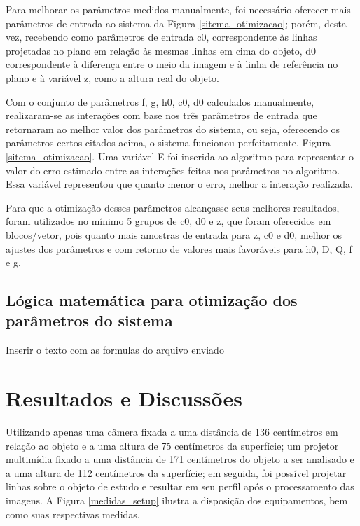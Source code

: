 \documentclass[a4paper, 12pt]{article}
\begin{document}
Para melhorar os parâmetros medidos manualmente, foi necessário oferecer mais parâmetros de entrada ao sistema da Figura \ref{sitema_otimizacao}; porém, desta vez, recebendo como parâmetros de entrada c0, correspondente às linhas projetadas no plano em relação às mesmas linhas em cima do objeto, d0 correspondente à diferença entre o meio da imagem e à linha de referência no plano e à variável z, como a altura real do objeto.

Com o conjunto de parâmetros f, g, h0, c0, d0 calculados manualmente, realizaram-se as interações com base nos três parâmetros de entrada que retornaram ao melhor valor dos parâmetros do sistema, ou seja, oferecendo os parâmetros certos citados acima, o sistema funcionou perfeitamente, Figura \ref{sitema_otimizacao}. Uma variável E foi inserida ao algoritmo para representar o valor do erro estimado entre as interações feitas nos parâmetros no algoritmo. Essa variável representou que quanto menor o erro, melhor a interação realizada.

Para que a otimização desses parâmetros alcançasse seus melhores resultados, foram utilizados no mínimo 5 grupos de c0, d0 e z, que foram oferecidos em blocos/vetor, pois quanto mais amostras de entrada para z, c0 e d0, melhor os ajustes dos parâmetros e com retorno de valores mais favoráveis para h0, D, Q, f e g. 

\subsection{Lógica matemática para otimização dos parâmetros do sistema}

Inserir o texto com as formulas do arquivo enviado


\section{Resultados e Discussões}

Utilizando apenas uma câmera fixada a uma distância de 136 centímetros em relação ao objeto e a uma altura de 75 centímetros da superfície; um projetor multimídia fixado a uma distância de 171 centímetros do objeto a ser analisado e a uma altura de 112 centímetros da superfície; em seguida, foi possível projetar linhas sobre o objeto de estudo e resultar em seu perfil após o processamento das imagens. A Figura \ref{medidas_setup} ilustra a disposição dos equipamentos, bem como suas respectivas medidas.
\end{document}

